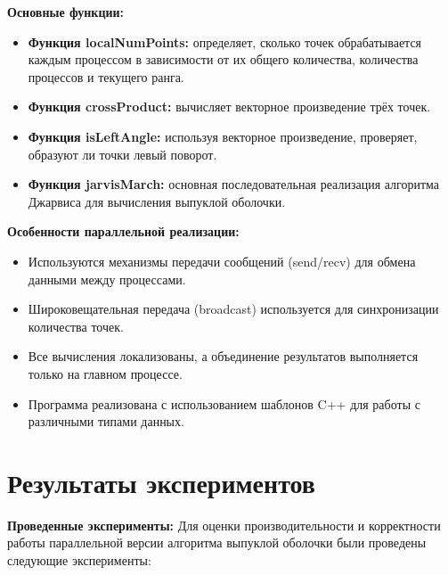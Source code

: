\documentclass[a4paper,12pt]{article}
\begin{document}
\textbf{Основные функции:}
\begin{itemize}
    \item \textbf{Функция localNumPoints:} определяет, сколько точек обрабатывается каждым процессом в зависимости от их общего количества, количества процессов и текущего ранга.
    \item \textbf{Функция crossProduct:} вычисляет векторное произведение трёх точек.
    \item \textbf{Функция isLeftAngle:} используя векторное произведение, проверяет, образуют ли точки левый поворот.
    \item \textbf{Функция jarvisMarch:} основная последовательная реализация алгоритма Джарвиса для вычисления выпуклой оболочки.
\end{itemize}

\textbf{Особенности параллельной реализации:}
\begin{itemize}
    \item Используются механизмы передачи сообщений (send/recv) для обмена данными между процессами.
    \item Широковещательная передача (broadcast) используется для синхронизации количества точек.
    \item Все вычисления локализованы, а объединение результатов выполняется только на главном процессе.
    \item Программа реализована с использованием шаблонов C++ для работы с различными типами данных.
\end{itemize}

\newpage

\section{Результаты экспериментов}
\textbf{Проведенные эксперименты:}
Для оценки производительности и корректности работы параллельной версии алгоритма выпуклой оболочки были проведены следующие эксперименты:
\end{document}
